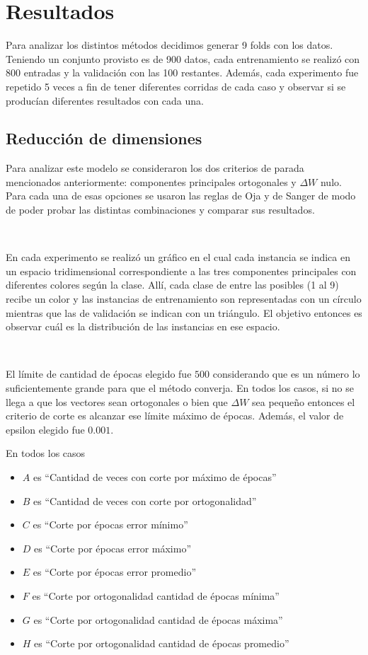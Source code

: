 \documentclass[informe.tex]{subfiles}
\begin{document}
  
  \section{Resultados}
    Para analizar los distintos métodos decidimos generar 9 folds con los datos. Teniendo un conjunto provisto es de 900 datos, cada entrenamiento se realiz\'o con 800 entradas y la validación con las 100 restantes. Además, cada experimento fue repetido 5 veces a fin de tener diferentes corridas de cada caso y observar si se produc\'ian diferentes resultados con cada una.
    
    \subsection{Reducción de dimensiones}
      Para analizar este modelo se consideraron los dos criterios de parada mencionados anteriormente: componentes principales ortogonales y $\Delta W$ nulo. Para cada una de esas opciones se usaron las reglas de Oja y de Sanger de modo de poder probar las distintas combinaciones y comparar sus resultados. 
      
      ~
      
      En cada experimento se realizó un gráfico en el cual cada instancia se indica en un espacio tridimensional correspondiente a las tres componentes principales con diferentes colores según la clase. Allí, cada clase de entre las posibles (1 al 9) recibe un color y las instancias de entrenamiento son representadas con un círculo mientras que las de validación se indican con un triángulo. El objetivo entonces es observar cuál es la distribución de las instancias en ese espacio.
      
      ~
      
      El l\'imite de cantidad de \'epocas elegido fue $500$ considerando que es un n\'umero lo suficientemente grande para que el método converja. En todos los casos, si no se llega a que los vectores sean ortogonales o bien que $\Delta W$ sea pequeño entonces el criterio de corte es alcanzar ese límite máximo de épocas. Además, el valor de epsilon elegido fue $0.001$.

      En todos los casos 
      \begin{itemize}
       \item $A$ es ``Cantidad de veces con corte por máximo de épocas''
       \item $B$ es ``Cantidad de veces con corte por ortogonalidad''
       \item $C$ es ``Corte por épocas error mínimo''
       \item $D$ es ``Corte por épocas error máximo''
       \item $E$ es ``Corte por épocas error promedio''
       \item $F$ es ``Corte por ortogonalidad cantidad de épocas mínima''
       \item $G$ es ``Corte por ortogonalidad cantidad de épocas máxima''
       \item $H$ es ``Corte por ortogonalidad cantidad de épocas promedio''
      \end{itemize}
 
\end{document}
